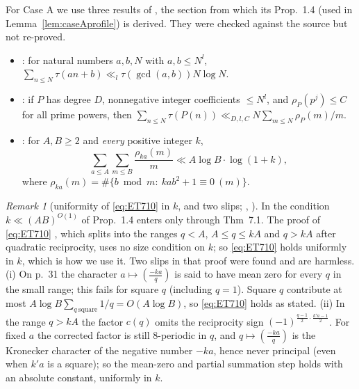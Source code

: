 \documentclass[10pt,reqno]{amsart}
\theoremstyle{definition}
\theoremstyle{remark}
\newtheorem{remark}[theorem]{Remark}
\begin{document}
For Case A we use three results of \cite[\S7]{ElsholtzTao}, the section
from which its Prop.~1.4 (used in Lemma~\ref{lem:caseAprofile}) is
derived.  They were checked against the source but not re-proved.
\begin{itemize}
\item \cite[Cor.~7.4]{ElsholtzTao}: for natural numbers $a,b,N$ with
  $a,b\leq N^l$, $\sum_{n\leq N}\tau(an+b)\ll_l\tau(\gcd(a,b))N\log N$.
\item \cite[Thm~7.1]{ElsholtzTao}: if $P$ has degree $D$, nonnegative
  integer coefficients $\leq N^l$, and $\rho_P(p^j)\leq C$ for all prime powers,
  then $\sum_{n\leq N}\tau(P(n))\ll_{D,l,C}N\sum_{m\leq N}\rho_P(m)/m$.
\item \cite[(7.10)]{ElsholtzTao}: for $A,B\geq2$ and \emph{every} positive
  integer $k$,
  \begin{equation}\label{eq:ET710}
   \sum_{a\leq A}\sum_{m\leq B}\frac{\rho_{ka}(m)}m\ll A\log B\cdot\log(1+k),
  \end{equation}
  where $\rho_{ka}(m)=\#\{b\bmod m:\ kab^2+1\equiv0\ (m)\}$.
\end{itemize}
\begin{remark}[uniformity of \eqref{eq:ET710} in $k$, and two slips; {\cite[\S3]{KA3}}, {\cite[uniformity check, steps~3, 5]{KA3rev}}]\label{rem:ETslips}
In \cite{ElsholtzTao} the condition $k\ll(AB)^{O(1)}$ of Prop.~1.4 enters
only through Thm~7.1.  The proof of \eqref{eq:ET710}
\cite[pp.~30--32]{ElsholtzTao}, which splits into the ranges $q<A$,
$A\leq q\leq kA$ and $q>kA$ after quadratic reciprocity, uses no size
condition on $k$; so \eqref{eq:ET710} holds uniformly in $k$, which is how
we use it.  Two slips in that proof were found and are harmless.
(i) On p.~31 the character $a\mapsto(\frac{-ka}q)$ is said to have mean zero
for every $q$ in the small range; this fails for square $q$ (including
$q=1$).  Square $q$ contribute at most $A\log B\sum_{q\ \text{square}}1/q=O(A\log B)$,
so \eqref{eq:ET710} holds as stated.  (ii) In the range $q>kA$ the factor
$c(q)$ omits the reciprocity sign $(-1)^{\frac{q-1}2\cdot\frac{k'a-1}2}$.  For fixed $a$
the corrected factor is still $8$-periodic in $q$, and $q\mapsto(\frac{-ka}q)$ is
the Kronecker character of the negative number $-ka$, hence never
principal (even when $k'a$ is a square); so the mean-zero and partial
summation step holds with an absolute constant, uniformly in $k$.
\end{remark}
\end{document}
